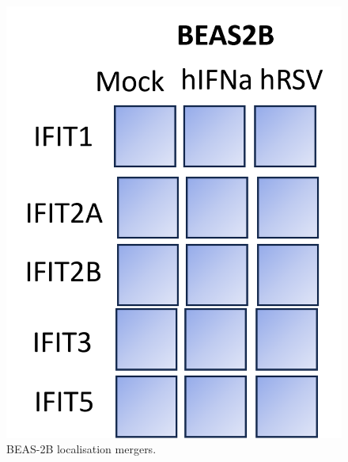 \begin{figure}
    \centering
    \includegraphics[width=1\linewidth]{06. Chapter 1/Figs/03. Localisation/03. beas2b merges.png}
    \caption[BEAS-2B localisation mergers.]{BEAS-2B localisation mergers.}
    \label{BEAS-2B localisation mergers.}
\end{figure}


